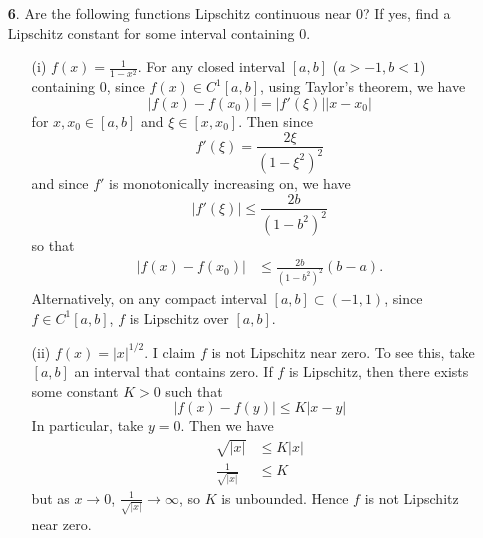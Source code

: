 \documentclass{article}
\begin{document}
\begin{itemize}
    \item[\textbf{6}.] Are the following functions Lipschitz continuous near 0? If yes, find a Lipschitz constant for some interval containing 0.
    \begin{itemize}
        \item[(i)] $f(x) = \frac{1}{1 - x^2}$.
        \newline\newline
        For any closed interval $[a,b]$ ($a > -1, b < 1$) containing 0, since $f(x) \in C^1[a,b]$, using Taylor's theorem, we have
        \[|f(x) - f(x_0)| = |f'(\xi)||x - x_0|\]
        for $x,x_0 \in [a,b]$ and $\xi \in [x,x_0]$. Then since 
        \[f'(\xi) = \frac{2\xi}{(1 - \xi^2)^2}\]
        and since $f'$ is monotonically increasing on, we have
        \[|f'(\xi)| \leq \frac{2b}{(1 - b^2)^2}\]
        so that
        \begin{align*}
            |f(x) - f(x_0)| &\leq \frac{2b}{(1 - b^2)^2} (b - a).
        \end{align*}
        Alternatively, on any compact interval $[a,b] \subset (-1,1)$, since $f \in C^1[a,b]$, $f$ is Lipschitz over $[a,b]$.
        
        
        \item[(ii)] $f(x) = |x|^{1/2}$.
        \newline\newline
        I claim $f$ is not Lipschitz near zero. To see this, take $[a,b]$ an interval that contains zero. If $f$ is Lipschitz, then there exists some constant $K > 0$ such that
        \[|f(x) - f(y)| \leq K|x - y|\]
        In particular, take $y = 0$. Then we have
        \begin{align*}
            \sqrt{|x|} &\leq K|x|\\
            \frac{1}{\sqrt{|x|}} &\leq K
        \end{align*}
        but as $x \to 0$, $\frac{1}{\sqrt{|x|}} \to \infty$, so $K$ is unbounded. Hence $f$ is not Lipschitz near zero.
        


\end{itemize}
\end{itemize}
\end{document}
